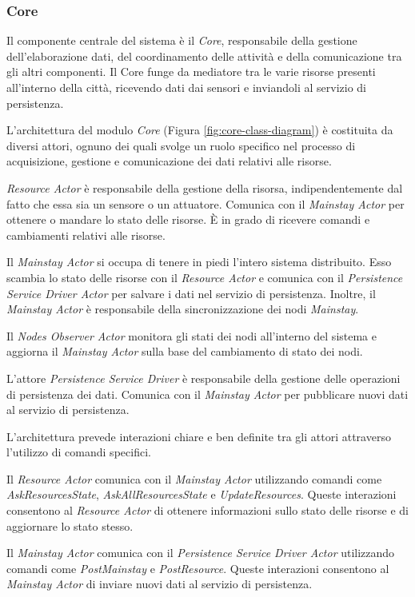 \documentclass{scrartcl}
\begin{document}
\subsubsection{Core}
Il componente centrale del sistema è il \textit{Core}, responsabile della gestione dell'elaborazione dati, del coordinamento delle attività e della comunicazione tra gli altri componenti. Il Core funge da mediatore tra le varie risorse presenti all'interno della città, ricevendo dati dai sensori e inviandoli al servizio di persistenza.

L'architettura del modulo \textit{Core} (Figura \ref{fig:core-class-diagram}) è costituita da diversi attori, ognuno dei quali svolge un ruolo specifico nel processo di acquisizione, gestione e comunicazione dei dati relativi alle risorse.

\textit{Resource Actor} è responsabile della gestione della risorsa, indipendentemente dal fatto che essa sia un sensore o un attuatore. Comunica con il \textit{Mainstay Actor} per ottenere o mandare lo stato delle risorse. È in grado di ricevere comandi e cambiamenti relativi alle risorse.

Il \textit{Mainstay Actor} si occupa di tenere in piedi l'intero sistema distribuito. Esso scambia lo stato delle risorse con il \textit{Resource Actor} e comunica con il \textit{Persistence Service Driver Actor} per salvare i dati nel servizio di persistenza. Inoltre, il \textit{Mainstay Actor} è responsabile della sincronizzazione dei nodi \textit{Mainstay}.

Il \textit{Nodes Observer Actor} monitora gli stati dei nodi all'interno del sistema e aggiorna il \textit{Mainstay Actor} sulla base del cambiamento di stato dei nodi.

L'attore \textit{Persistence Service Driver} è responsabile della gestione delle operazioni di persistenza dei dati. Comunica con il \textit{Mainstay Actor} per pubblicare nuovi dati al servizio di persistenza.

L'architettura prevede interazioni chiare e ben definite tra gli attori attraverso l'utilizzo di comandi specifici.

Il \textit{Resource Actor} comunica con il \textit{Mainstay Actor} utilizzando comandi come \textit{AskResourcesState}, \textit{AskAllResourcesState} e \textit{UpdateResources}. Queste interazioni consentono al \textit{Resource Actor} di ottenere informazioni sullo stato delle risorse e di aggiornare lo stato stesso.

Il \textit{Mainstay Actor} comunica con il \textit{Persistence Service Driver Actor} utilizzando comandi come \textit{PostMainstay} e \textit{PostResource}. Queste interazioni consentono al \textit{Mainstay Actor} di inviare nuovi dati al servizio di persistenza.
\end{document}
